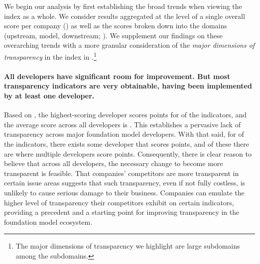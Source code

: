 \documentclass[screen, authorversion, acmsmall]{acmart}
\begin{document}
We begin our analysis by first establishing the broad trends when viewing the index as a whole.
We consider results aggregated at the level of a single overall score per company () as well as the scores broken down into the \numdomains domains (upstream, model, downstream; ).
We supplement our findings on these overarching trends with a more granular consideration of the \textit{major dimensions of transparency} in the index in .\footnote{
The major dimensions of transparency we highlight are \nummajorsubdomains large subdomains among the \numsubdomains subdomains. }


\paragraph{All developers have significant room for improvement. But most transparency indicators are very obtainable, having been implemented by at least one developer.}
Based on , the highest-scoring developer scores points for \maxscore of the \numindicators indicators, and the average score across all developers is \meanscore.
This establishes a pervasive lack of transparency across major foundation model developers.
With that said, for \numfeasible of the \numindicators indicators, there exists some developer that scores points, and of these there are \numfeasiblemultiple where multiple developers score points. 
Consequently, there is clear reason to believe that across all developers, the necessary change to become more transparent is feasible.
That companies' competitors are more transparent in certain issue areas suggests that such transparency, even if not fully costless, is unlikely to cause serious damage to their business.
Companies can emulate the higher level of transparency their competitors exhibit on certain indicators, providing a precedent and a starting point for improving transparency in the foundation model ecosystem. 
\end{document}
